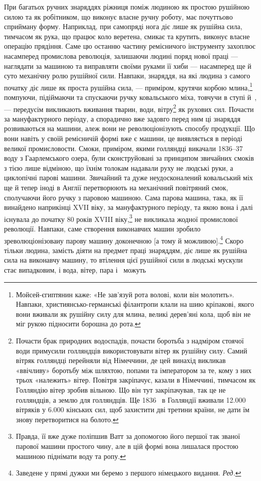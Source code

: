 При багатьох ручних знаряддях ріжниця поміж людиною як
простою рушійною силою та як робітником, що виконує власне
ручну роботу, має почуттьово сприйману форму. Наприклад,
при самопряді нога діє лише як рушійна сила, тимчасом як рука,
що працює коло веретена, смикає та крутить, виконує власне
операцію прядіння. Саме цю останню частину ремісничого інструменту
захоплює насамперед промислова революція, залишаючи
людині поряд нової праці — наглядати за машиною та виправляти
своїми руками її хиби — насамперед ще й суто механічну ролю
рушійної сили. Навпаки, знаряддя, на які людина з самого початку
діє лише як проста рушійна сила, — приміром, крутячи корбою
млина,\footnote{
Мойсей-єгиптянин каже: «Не зав’язуй рота волові, коли він молотить».
Навпаки, християнсько-германські філантропи клали на шию
кріпакові, якого вони вживали як рушійну силу для млина, великі дерев’яні
кола, щоб він не міг рукою підносити борошна до рота.
} помпуючи, підіймаючи та спускаючи ручку ковальського
міха, товчучи в ступі й~, — передусім викликають вживання
тварин, води, вітру\footnote{
Почасти брак природних водоспадів, почасти боротьба з надміром
стоячої води примусили голляндців використовувати вітер як рушійну
силу. Самий вітряк голляндці перейняли від Німеччини, де цей винахід
викликав «ввічливу» боротьбу між шляхтою, попами та імператором за те,
кому з них трьох «належить» вітер. Повітря закріпачує, казали в Німеччині,
тимчасом як Голляндію вітер зробив вільною. Що він тут закріпачував,
так це не голляндців, а землю для голляндців. Ще 1836~
в Голляндії вживали \num{12.000} вітряків у \num{6.000} кінських сил, щоб захистити
дві третини країни, не дати їм знову перетворитися на болото.
} як рухових сил. Почасти за мануфактурного
періоду, а спорадично вже задовго перед ним ці знаряддя
розвиваються на машини, алеж вони не революціонізують способу
продукції. Що вони навіть у своїй ремісничій формі вже є
машини, це виявляється в періоді великої промисловости. Смоки,
приміром, якими голляндці викачали 1836--37~ воду з Гаарлемського
озера, були сконструйовані за принципом звичайних
смоків з тією лише відміною, що їхнім толокам надавали руху не
людські руки, а циклопічні парові машини. Звичайний та дуже
неудосконалений ковальський міх ще й тепер іноді в Англії перетворюють
на механічний повітряний смок, сполучаючи його
ручку з паровою машиною. Сама парова машина, така, як її
винайдено наприкінці XVII віку, за мануфактурного періоду,
та якою вона і далі існувала до початку 80 років XVIII віку,\footnote{
Правда, її вже дуже поліпшив Ватт за допомогою його першої
так званої парової машини простого чину, але в цій формі вона лишалася
простою машиною піднімати воду та ропу.
}
не викликала жодної промислової революції. Навпаки, саме створення
виконавчих машин зробило зреволюціонізоваиу парову
машину доконечною [а тому й можливою].\footnote*{
Заведене у прямі дужки ми беремо з першого німецького видання.
\emph{Ред.}
} Скоро тільки людина,
замість діяти на предмет праці знаряддям, діє лише як рушійна
сила на виконавчу машину, то втілення цієї рушійної сили в
людські мускули стає випадковим, і вода, вітер, пара і~ можуть
\parbreak{}  %
